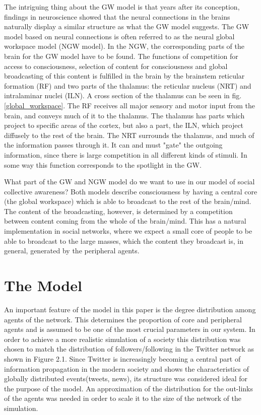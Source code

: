 \documentclass [12pt,a4paper,twoside]{article}
\begin{document}
The intriguing thing about the GW model is that years after its conception, findings in neuroscience showed that the neural connections in the brains naturally display a similar structure as what the GW model suggests. The GW model based on neural connections is often referred to as the neural global workspace model (NGW model). In the NGW, the corresponding parts of the brain for the GW model have to be found. The functions of competition for access to consciousness, selection of content for consciousness and global broadcasting of this content is fulfilled in the brain by the brainstem reticular formation (RF) and two parts of the thalamus: the reticular nucleus (NRT) and intralaminar nuclei (ILN). A cross section of the thalamus can be seen in fig. \ref{global_workspace}. The RF receives all major sensory and motor input from the brain, and conveys much of it to the thalamus. The thalamus has parts which project to specific areas of the cortex, but also a part, the ILN, which project diffusely to the rest of the brain. The NRT surrounds the thalamus, and much of the information passes through it. It can and must "gate" the outgoing information, since there is large competition in all different kinds of stimuli. In some way this function corresponds to the spotlight in the GW. \cite{lecture-notes}

What part of the GW and NGW model do we want to use in our model of social collective awareness? Both models describe consciousness by having a central core (the global workspace) which is able to broadcast to the rest of the brain/mind. The content of the broadcasting, however, is determined by a competition between content coming from the whole of the brain/mind. This has a natural implementation in social networks, where we expect a small core of people to be able to broadcast to the large masses, which the content they broadcast is, in general, generated by the peripheral agents.


\section{The Model}
An important feature of the model in this paper is the degree distribution among agents of the network. This determines the proportion of core and peripheral agents and is assumed to be one of the most crucial parameters in our system. In order to achieve a more realistic simulation of a society this distribution was chosen to match the distribution of followers/following in the Twitter network as shown in Figure 2.1. Since Twitter is increasingly becoming a central part of information propagation in the modern society and shows the characteristics of globally distributed events(tweets, news), its structure was considered ideal for the purpose of the model. An approximation of the distribution for the out-links of the agents was needed in order to scale it to the size of the network of the simulation.
\end{document}
